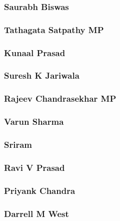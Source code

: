 \documentclass{article}
\begin{document}
\subsubsection{Saurabh Biswas}


\subsubsection{Tathagata Satpathy MP}


\subsubsection{Kunaal Prasad}


\subsubsection{Suresh K Jariwala}


\subsubsection{Rajeev Chandrasekhar MP}


\subsubsection{Varun Sharma}


\subsubsection{Sriram}


\subsubsection{Ravi V Prasad}


\subsubsection{Priyank Chandra}


\subsubsection{Darrell M West}

\end{document}
